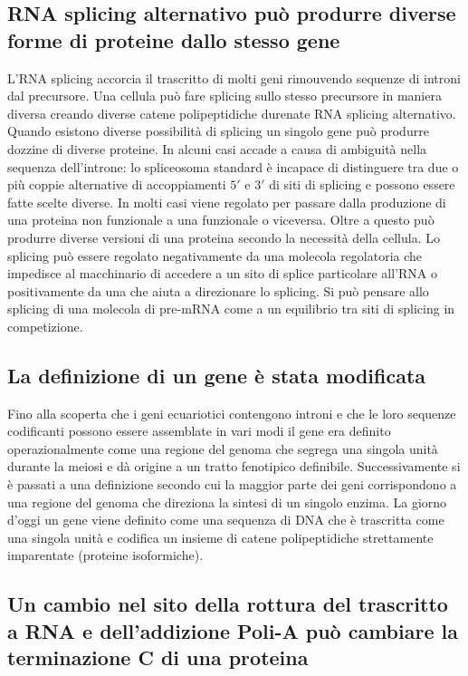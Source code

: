 \subsection{RNA splicing alternativo pu\`o produrre diverse forme di proteine dallo stesso gene}
L'RNA splicing accorcia il trascritto di molti geni rimouvendo sequenze di introni dal precursore. Una cellula pu\`o fare splicing sullo stesso precursore in maniera diversa creando 
diverse catene polipeptidiche durenate RNA splicing alternativo. Quando esistono diverse possibilit\`a di splicing un singolo gene pu\`o produrre dozzine di diverse proteine. In alcuni
casi accade a causa di ambiguit\`a nella sequenza dell'introne: lo spliceosoma standard \`e incapace di distinguere tra due o pi\`u coppie alternative di accoppiamenti $5'$ e $3'$ di 
siti di splicing e possono essere fatte scelte diverse. In molti casi viene regolato per passare dalla produzione di una proteina non funzionale  a una funzionale o viceversa. Oltre a
questo pu\`o produrre diverse versioni di una proteina secondo la necessit\`a della cellula. Lo splicing pu\`o essere regolato negativamente da una molecola regolatoria che impedisce 
al macchinario di accedere a un sito di splice particolare all'RNA o positivamente da una che aiuta a direzionare lo splicing. Si pu\`o pensare allo splicing di una molecola di pre-mRNA
come a un equilibrio tra siti di splicing in competizione. 
\subsection{La definizione di un gene \`e stata modificata}
Fino alla scoperta che i geni ecuariotici contengono introni e che le loro sequenze codificanti possono essere assemblate in vari modi il gene era definito operazionalmente come una
regione del genoma che segrega una singola unit\`a durante la meiosi e d\`a origine a un tratto fenotipico definibile. Successivamente si \`e passati a una definizione secondo cui
la maggior parte dei geni corrispondono a una regione del genoma che direziona la sintesi di un singolo enzima. La giorno d'oggi un gene viene definito come una sequenza di DNA che \`e
trascritta come una singola unit\`a e codifica un insieme di catene polipeptidiche strettamente imparentate (proteine isoformiche). 
\subsection{Un cambio nel sito della rottura del trascritto a RNA e dell'addizione Poli-A pu\`o cambiare la terminazione C di una proteina}

